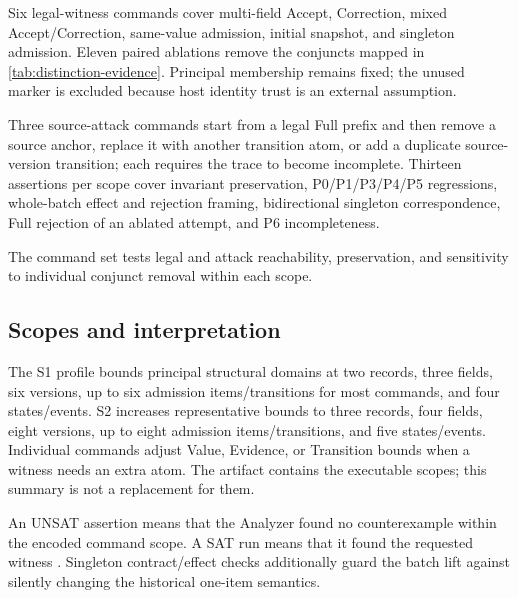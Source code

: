 Six legal-witness commands cover multi-field Accept, Correction, mixed Accept/Correction, same-value admission, initial snapshot, and singleton admission. Eleven paired ablations remove the conjuncts mapped in \cref{tab:distinction-evidence}. Principal membership remains fixed; the unused  marker is excluded because host identity trust is an external assumption.

Three source-attack commands start from a legal Full prefix and then remove a source anchor, replace it with another transition atom, or add a duplicate source-version transition; each requires the trace to become incomplete. Thirteen assertions per scope cover invariant preservation, P0/P1/P3/P4/P5 regressions, whole-batch effect and rejection framing, bidirectional singleton correspondence, Full rejection of an ablated attempt, and P6 incompleteness.

The command set tests legal and attack reachability, preservation, and sensitivity to individual conjunct removal within each scope.

\subsection{Scopes and interpretation}

The S1 profile bounds principal structural domains at two records, three fields, six versions, up to six admission items/transitions for most commands, and four states/events. S2 increases representative bounds to three records, four fields, eight versions, up to eight admission items/transitions, and five states/events. Individual commands adjust Value, Evidence, or Transition bounds when a witness needs an extra atom. The artifact contains the executable scopes; this summary is not a replacement for them.



An UNSAT assertion means that the Analyzer found no counterexample within the encoded command scope. A SAT run means that it found the requested witness \citep{jackson2002alloy,torlak2007kodkod}. Singleton contract/effect checks additionally guard the batch lift against silently changing the historical one-item semantics.
